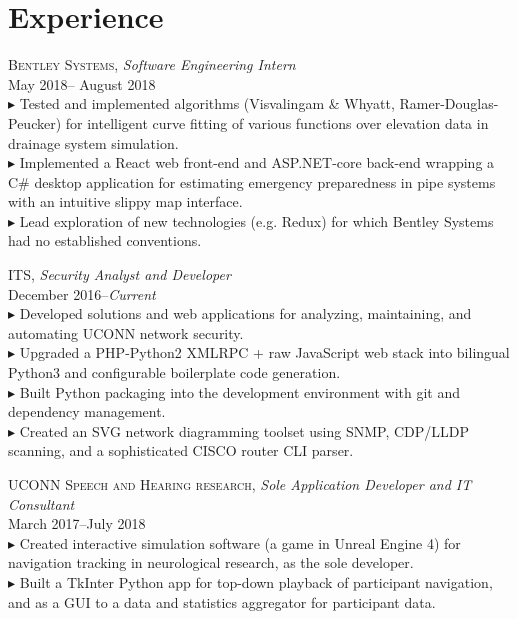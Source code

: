 \documentclass[Letterpaper,11pt]{article}
\newcommand{\bul}{$\blacktriangleright$ }
\begin{document}
\vspace{-1.5em} %
\section*{Experience}
\vspace{0.1em}

    \textsc{Bentley Systems},
    \textit{Software Engineering Intern}\\
    May 2018-- August 2018\\
        \bul Tested and implemented algorithms (Visvalingam \& Whyatt, Ramer-Douglas-Peucker) 
        for intelligent curve fitting of various functions over elevation data in 
        drainage system simulation.
        \\
        \bul Implemented a React web front-end and ASP.NET-core back-end wrapping a C\# desktop 
        application for estimating emergency preparedness in pipe systems with an intuitive 
        slippy map interface.
        \\
        \bul Lead exploration of new technologies (e.g. Redux) for which Bentley Systems
        had no established conventions.

    \textsc{ITS},
    \textit{Security Analyst and Developer}\\
    December 2016--\textit{Current}\\
        \bul Developed solutions and web applications for analyzing, maintaining, and automating UCONN network security.
        \\
        \bul Upgraded a PHP-Python2 XMLRPC + raw JavaScript web stack into bilingual Python3 
        and configurable boilerplate code generation.
        \\
        \bul Built Python packaging into the development environment with git and 
        dependency management.
        \\
        \bul Created an SVG network diagramming toolset using SNMP, CDP/LLDP scanning, 
        and a sophisticated CISCO router CLI parser.

    \textsc{UCONN Speech and Hearing research},
    \textit{Sole Application Developer and IT Consultant}\\
    March 2017--July 2018\\
        \bul Created interactive simulation software (a game in Unreal Engine 4) 
        for navigation tracking in neurological research, as the sole developer.
        \\
        \bul Built a TkInter Python app for top-down playback of participant navigation,
        and as a GUI to a data and statistics aggregator for participant data.
        
\end{document}

